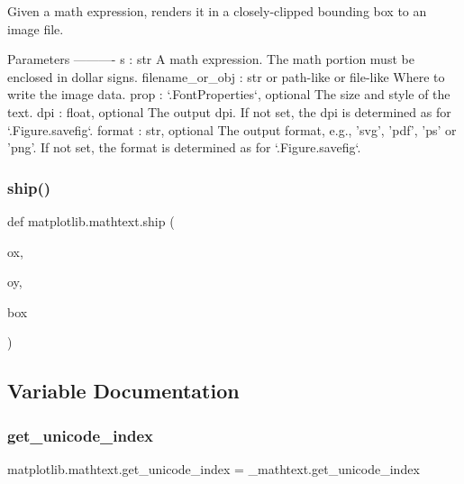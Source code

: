 \begin{DoxyVerb}Given a math expression, renders it in a closely-clipped bounding
box to an image file.

Parameters
----------
s : str
    A math expression.  The math portion must be enclosed in dollar signs.
filename_or_obj : str or path-like or file-like
    Where to write the image data.
prop : `.FontProperties`, optional
    The size and style of the text.
dpi : float, optional
    The output dpi.  If not set, the dpi is determined as for
    `.Figure.savefig`.
format : str, optional
    The output format, e.g., 'svg', 'pdf', 'ps' or 'png'.  If not set, the
    format is determined as for `.Figure.savefig`.
\end{DoxyVerb}
 \mbox{\label{namespacematplotlib_1_1mathtext_abe5b6c35a0a4cbd99b0f5fa7e2f980ff}} 
\subsubsection{\texorpdfstring{ship()}{ship()}}
{\footnotesize\ttfamily def matplotlib.\+mathtext.\+ship (\begin{DoxyParamCaption}\item[{}]{ox,  }\item[{}]{oy,  }\item[{}]{box }\end{DoxyParamCaption})}



\subsection{Variable Documentation}
\mbox{\label{namespacematplotlib_1_1mathtext_adfdb95794ad7f1c39fc7a443ef1a9e24}} 
\subsubsection{\texorpdfstring{get\+\_\+unicode\+\_\+index}{get\_unicode\_index}}
{\footnotesize\ttfamily matplotlib.\+mathtext.\+get\+\_\+unicode\+\_\+index = \+\_\+mathtext.\+get\+\_\+unicode\+\_\+index}


